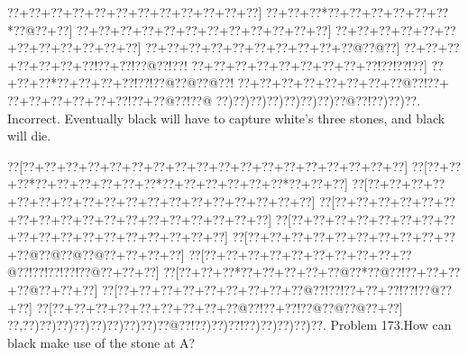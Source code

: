 \documentclass[a5paper]{article}
\begin{document}
\begin{center}
{\goo
\0??+\0??+\0??+\0??+\0??+\0??+\0??+\0??+\0??+\0??+\0??+\0??]
\0??+\0??+\0??*\0??+\0??+\0??+\0??+\0??+\0??*\0??@\0??+\0??]
\0??+\0??+\0??+\0??+\0??+\0??+\0??+\0??+\0??+\0??+\0??+\0??]
\0??+\0??+\0??+\0??+\0??+\0??+\0??+\0??+\0??+\0??+\0??+\0??]
\0??+\0??+\0??+\0??+\0??+\0??+\0??+\0??+\0??+\0??@\0??@\0??]
\0??+\0??+\0??+\0??+\0??+\0??+\0??!\0??+\0??!\0??@\0??!\0??!
\0??+\0??+\0??+\0??+\0??+\0??+\0??+\0??+\0??!\0??!\0??!\0??]
\0??+\0??+\0??*\0??+\0??+\0??+\0??!\0??!\0??@\0??@\0??@\0??!
\0??+\0??+\0??+\0??+\0??+\0??+\0??+\0??@\0??!\0??+
\0??+\0??+\0??+\0??+\0??+\0??!\0??+\0??@\0??!\0??@
\0??)\0??)\0??)\0??)\0??)\0??)\0??)\0??@\0??!\0??)\0??)\0??.
}
Incorrect. Eventually black will have to capture white's three stones, and black will die.

\end{center}
\newpage
\begin{center}
{\goo
\0??[\0??+\0??+\0??+\0??+\0??+\0??+\0??+\0??+\0??+\0??+\0??+\0??+\0??+\0??+\0??+\0??+\0??+\0??]
\0??[\0??+\0??+\0??*\0??+\0??+\0??+\0??+\0??+\0??*\0??+\0??+\0??+\0??+\0??+\0??*\0??+\0??+\0??]
\0??[\0??+\0??+\0??+\0??+\0??+\0??+\0??+\0??+\0??+\0??+\0??+\0??+\0??+\0??+\0??+\0??+\0??+\0??]
\0??[\0??+\0??+\0??+\0??+\0??+\0??+\0??+\0??+\0??+\0??+\0??+\0??+\0??+\0??+\0??+\0??+\0??+\0??]
\0??[\0??+\0??+\0??+\0??+\0??+\0??+\0??+\0??+\0??+\0??+\0??+\0??+\0??+\0??+\0??+\0??+\0??+\0??]
\0??[\0??+\0??+\0??+\0??+\0??+\0??+\0??+\0??+\0??+\0??+\0??@\0??@\0??@\0??@\0??+\0??+\0??+\0??]
\0??[\0??+\0??+\0??+\0??+\0??+\0??+\0??+\0??+\0??+\0??@\0??!\0??!\0??!\0??!\0??@\0??+\0??+\0??]
\0??[\0??+\0??+\0??*\0??+\0??+\0??+\0??+\0??@\0??*\0??@\0??!\0??+\0??+\0??+\0??@\0??+\0??+\0??]
\0??[\0??+\0??+\0??+\0??+\0??+\0??+\0??+\0??+\0??@\0??!\0??!\0??+\0??+\0??!\0??!\0??@\0??+\0??]
\0??[\0??+\0??+\0??+\0??+\0??+\0??+\0??+\0??+\0??@\0??!\0??+\0??!\0??@\0??@\0??@\0??+\0??]
\0??,\0??)\0??)\0??)\0??)\0??)\0??)\0??)\0??)\0??@\0??!\0??)\0??)\0??!\0??)\0??)\0??)\0??)\0??.
}
Problem 173.How can black make use of the stone at A?

\end{center}
\end{document}
